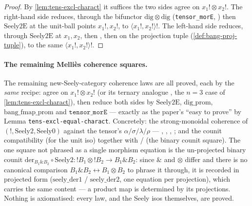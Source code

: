 \begin{proof}
By \autoref{lem:tens-excl-charact} it suffices the two sides agree on
$x_1! \otimes x_2!$. The right-hand side reduces, through the bifunctor
$\mathrm{dig} \otimes \mathrm{dig}$ (\texttt{tensor\_morE},
) then $\mathrm{Seely2E}$ at the
unit-ball points $x_1!, x_2!$, to $\langle x_1!, x_2! \rangle!$. The
left-hand side reduces, through $\mathrm{Seely2E}$ at $x_1, x_2$, then
, then
 on the projection tuple
(\autoref{def:bang-proj-tuple}), to the same $\langle x_1!, x_2!
\rangle!$.
\end{proof}

\paragraph{The remaining Melli\`es coherence squares.}
The remaining new-Seely-category coherence laws are all proved, each by
the \emph{same} recipe: agree on $x_1! \otimes x_2!$ (or its ternary
analogue , the $n = 3$ case
of \autoref{lem:tens-excl-charact}), then reduce both sides by
$\mathrm{Seely2E}$, $\mathrm{dig\_prom}$, $\mathrm{bang\_fmap\_prom}$ and
$\texttt{tensor\_morE}$ --- exactly as the paper's ``easy to prove'' by
Lemma \texttt{tens-excl-equal-charact}. Concretely: the strong-monoidal
coherence of $(\mathord{!}, \mathrm{Seely2}, \mathrm{Seely0})$ against the
tensor's $\alpha/\sigma/\lambda/\rho$ ---
,
,
,
; and the counit
compatibility  (for the unit
iso) together with  /
 (the binary counit square). The one
square not phrased as a single morphism equation is the un-projected
binary counit $\mathrm{der}_{B_1 \mathbin{\&} B_2} \circ \mathrm{Seely2}
: \mathord{!}B_1 \otimes \mathord{!}B_2 \to B_1 \mathbin{\&} B_2$: since
$\mathbin{\&}$ and $\otimes$ differ and there is no canonical comparison
$B_1 \mathbin{\&} B_2 \leftrightarrow B_1 \otimes B_2$ to phrase it
through, it is recorded in projected form ($\mathrm{seely\_der1}$ /
$\mathrm{seely\_der2}$, one equation per projection), which carries the
same content --- a product map is determined by its projections. Nothing
is axiomatised: every law, and the Seely isos themselves, are proved.

